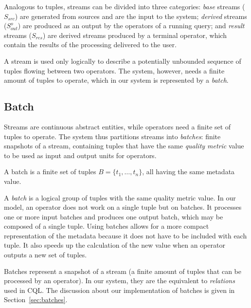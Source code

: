Analogous to tuples, streams can be divided into three categories: \textit{base} streams ($S_{src}$) are
generated from sources and are the input to the system; \emph{derived} streams ($S^{o}_{out}$) are
produced as an output by the operators of a running query; and \emph{result} streams ($S_{res}$) are
derived streams produced by a terminal operator, which contain the results of the processing delivered
to the user.

A stream is used only logically to describe a potentially unbounded sequence of tuples flowing between
two operators. The system, however, needs a finite amount of tuples to operate, which in our system is
represented by a \textit{batch}.

\subsection*{Batch}
Streams are continuous abstract entities, while operators need a finite set of tuples to operate.
The system thus partitions streams into \emph{batches}: finite snapshots of a stream, containing
tuples that have the same \emph{quality metric} value to be used as input and output units for
operators.

\begin{definition}[Batch]{
A batch is a finite set of tuples $B=\{t_1,\dots,t_n\}$, all having the same \qm metadata value.
}
\end{definition}

A \textit{batch} is a logical group of tuples with the same quality metric value. In our model, an
operator does not work on a single tuple but on batches. It processes one or more input batches and produces one
output batch, which may be composed of a single tuple.
Using batches allows for a more compact representation of the \qm metadata because it does not have to be
included with each tuple. It also speeds up the calculation of the new \qm value when an operator
outputs a new set of tuples.
 
Batches represent a snapshot of a stream (\ie a finite amount of tuples that can be processed by an
operator). In our system, they are the equivalent to \textit{relations} used in CQL.
The discussion about our implementation of batches is given in Section~\ref{sec:batches}.

\vspace{-10pt}
